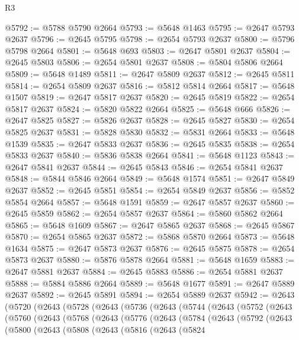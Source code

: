 \begin{lexlean}{R3}
\begin{coremodule}
@5792 := @5788 @5790 @2664
@5793 := @5648 @1463
@5795 := @2647 @5793 @2637
@5796 := @2645 @5795
@5798 := @2654 @5793 @2637
@5800 := @5796 @5798 @2664
@5801 := @5648 @693
@5803 := @2647 @5801 @2637
@5804 := @2645 @5803
@5806 := @2654 @5801 @2637
@5808 := @5804 @5806 @2664
@5809 := @5648 @1489
@5811 := @2647 @5809 @2637
@5812 := @2645 @5811
@5814 := @2654 @5809 @2637
@5816 := @5812 @5814 @2664
@5817 := @5648 @1507
@5819 := @2647 @5817 @2637
@5820 := @2645 @5819
@5822 := @2654 @5817 @2637
@5824 := @5820 @5822 @2664
@5825 := @5648 @666
@5826 := @2647 @5825
@5827 := @5826 @2637
@5828 := @2645 @5827
@5830 := @2654 @5825 @2637
@5831 := @5828 @5830
@5832 := @5831 @2664
@5833 := @5648 @1539
@5835 := @2647 @5833 @2637
@5836 := @2645 @5835
@5838 := @2654 @5833 @2637
@5840 := @5836 @5838 @2664
@5841 := @5648 @1123
@5843 := @2647 @5841 @2637
@5844 := @2645 @5843
@5846 := @2654 @5841 @2637
@5848 := @5844 @5846 @2664
@5849 := @5648 @1574
@5851 := @2647 @5849 @2637
@5852 := @2645 @5851
@5854 := @2654 @5849 @2637
@5856 := @5852 @5854 @2664
@5857 := @5648 @1591
@5859 := @2647 @5857 @2637
@5860 := @2645 @5859
@5862 := @2654 @5857 @2637
@5864 := @5860 @5862 @2664
@5865 := @5648 @1609
@5867 := @2647 @5865 @2637
@5868 := @2645 @5867
@5870 := @2654 @5865 @2637
@5872 := @5868 @5870 @2664
@5873 := @5648 @1634
@5875 := @2647 @5873 @2637
@5876 := @2645 @5875
@5878 := @2654 @5873 @2637
@5880 := @5876 @5878 @2664
@5881 := @5648 @1659
@5883 := @2647 @5881 @2637
@5884 := @2645 @5883
@5886 := @2654 @5881 @2637
@5888 := @5884 @5886 @2664
@5889 := @5648 @1677
@5891 := @2647 @5889 @2637
@5892 := @2645 @5891
@5894 := @2654 @5889 @2637
@5942 := @2643
    (@5720
      (@2643
        (@5728
          (@2643
            (@5736
              (@2643
                (@5744
                  (@2643
                    (@5752
                      (@2643
                        (@5760
                          (@2643
                            (@5768
                              (@2643
                                (@5776
                                  (@2643
                                    (@5784
                                      (@2643
                                        (@5792
                                          (@2643
                                            (@5800
                                              (@2643
                                                (@5808
                                                  (@2643
                                                    (@5816
                                                      (@2643
                                                        (@5824

\end{coremodule}
\end{lexlean}
